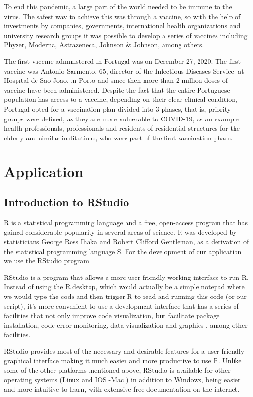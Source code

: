 \documentclass[11pt,a4paper]{report}
\begin{document}
   To end this pandemic, a large part of the world needed to be immune to the virus. The safest way to achieve this was through a vaccine, so with the help of investments by companies, governments, international health organizations and university research groups it was possible to develop a series of vaccines including Phyzer, Moderna, Astrazeneca, Johnson & Johnson, among others.

   The first vaccine administered in Portugal was on December 27, 2020. The first vaccine was António Sarmento, 65, director of the Infectious Diseases Service, at Hospital de São João, in Porto and since then more than 2 million doses of vaccine have been administered. Despite the fact that the entire Portuguese population has access to a vaccine, depending on their clear clinical condition, Portugal opted for a vaccination plan divided into 3 phases, that is, priority groups were defined, as they are more vulnerable to COVID-19, as an example health professionals, professionals and residents of residential structures for the elderly and similar institutions, who were part of the first vaccination phase.


\chapter{Application}




\section{Introduction to RStudio}
R is a statistical programming language and a free, open-access program that has gained considerable popularity in several areas of science. R was developed by statisticians George Ross Ihaka and Robert Clifford Gentleman, as a derivation of the statistical programming language S.
For the development of our application we use the RStudio program.

RStudio is a program that allows a more user-friendly working interface to run R. Instead of using the R desktop, which would actually be a simple notepad where we would type the code and then trigger R to read and running this code (or our script), it's more convenient to use a development interface that has a series of facilities that not only improve code visualization, but facilitate package installation, code error monitoring, data visualization and graphics , among other facilities.


RStudio provides most of the necessary and desirable features for a user-friendly graphical interface making it much easier and more productive to use R. Unlike some of the other platforms mentioned above, RStudio is available for other operating systems (Linux and IOS -Mac ) in addition to Windows, being easier and more intuitive to learn, with extensive free documentation on the internet.
\end{document}
